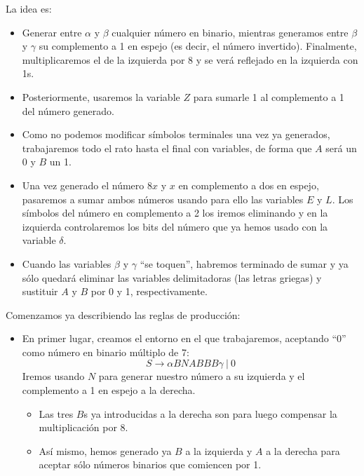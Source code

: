 \begin{ejercicio}
\begin{enumerate}
\begin{description}
                    La idea es:
                    \begin{itemize}
                        \item Generar entre $\alpha$ y $\beta$ cualquier número en binario, mientras generamos entre $\beta$ y $\gamma$ su complemento a 1 en espejo (es decir, el número invertido). Finalmente, multiplicaremos el de la izquierda por 8 y se verá reflejado en la izquierda con 1s.
                        \item Posteriormente, usaremos la variable $Z$ para sumarle 1 al complemento a 1 del número generado. 
                        \item Como no podemos modificar símbolos terminales una vez ya generados, trabajaremos todo el rato hasta el final con variables, de forma que $A$ será un 0 y $B$ un 1.
                        \item Una vez generado el número $8x$ y $x$ en complemento a dos en espejo, pasaremos a sumar ambos números usando para ello las variables $E$ y $L$. Los símbolos del número en complemento a 2 los iremos eliminando y en la izquierda controlaremos los bits del número que ya hemos usado con la variable $\delta$.
                        \item Cuando las variables $\beta$ y $\gamma$ ``se toquen'', habremos terminado de sumar y ya sólo quedará eliminar las variables delimitadoras (las letras griegas) y sustituir $A$ y $B$ por 0 y 1, respectivamente.
                    \end{itemize}
                    Comenzamos ya describiendo las reglas de producción:
                    \begin{itemize}
                        \item En primer lugar, creamos el entorno en el que trabajaremos, aceptando ``0'' como número en binario múltiplo de 7:
                            \begin{equation*}
                                S \rightarrow \alpha BNABBB\gamma\ |\ 0
                            \end{equation*}
                            Iremos usando $N$ para generar nuestro número a su izquierda y el complemento a 1 en espejo a la derecha. 
                            \begin{itemize}
                                \item Las tres $B$s ya introducidas a la derecha son para luego compensar la multiplicación por 8.
                                \item Así mismo, hemos generado ya $B$ a la izquierda y $A$ a la derecha para aceptar sólo números binarios que comiencen por 1.

\end{itemize}
\end{itemize}
\end{description}
\end{enumerate}
\end{ejercicio}
